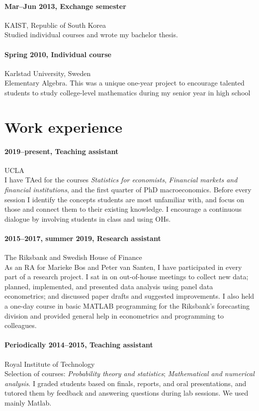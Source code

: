 \documentclass[letterpaper,10pt]{article}
\begin{document}
\paragraph{Mar--Jun 2013, Exchange semester}\hfill KAIST, Republic of South Korea\\
Studied individual courses and wrote my bachelor thesis.


\paragraph{Spring 2010, Individual course}\hfill Karlstad University, Sweden\\
Elementary Algebra. This was a unique one-year project to encourage talented students to study college-level mathematics during my senior year in high school

\section*{Work experience}
\paragraph{2019--present, Teaching assistant}\hfill UCLA\\
I have TAed for the courses \emph{Statistics for economists}, \emph{Financial markets and financial institutions}, and the first quarter of PhD macroeconomics. Before every session I identify the concepts students are most unfamiliar with, and focus on those and connect them to their existing knowledge. I encourage a continuous dialogue by involving students in class and using OHs.

\paragraph{2015--2017, summer 2019, Research assistant}\hfill The Riksbank and Swedish House of Finance\\
As an RA for Marieke Bos and Peter van Santen, I have participated in every part of a research project. I sat in on out-of-house meetings to collect new data; planned, implemented, and presented data analysis using panel data econometrics; and discussed paper drafts and suggested improvements. I also held a one-day course in basic MATLAB programming for the Riksbank's forecasting division and provided general help in econometrics and programming to colleagues.

\paragraph{Periodically 2014--2015, Teaching assistant}
\hfill Royal Institute of Technology\\
Selection of courses: \emph{Probability theory and statistics}; \emph{Mathematical and numerical analysis}. I graded students based on finals, reports, and oral presentations, and tutored them by feedback and answering questions during lab sessions. We used mainly Matlab.
\end{document}
